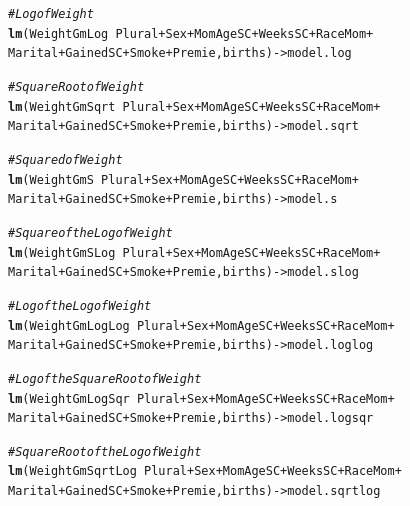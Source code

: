 \documentclass{article}\usepackage[]{graphicx}\usepackage[]{xcolor}
\makeatletter
\newcommand{\hlcom}[1]{\textcolor[rgb]{0.678,0.584,0.686}{\textit{#1}}}%
\newcommand{\hlopt}[1]{\textcolor[rgb]{0,0,0}{#1}}%
\newcommand{\hlstd}[1]{\textcolor[rgb]{0.345,0.345,0.345}{#1}}%
\newcommand{\hlkwb}[1]{\textcolor[rgb]{0.69,0.353,0.396}{#1}}%
\newcommand{\hlkwd}[1]{\textcolor[rgb]{0.737,0.353,0.396}{\textbf{#1}}}%
\newenvironment{kframe}{%
 \def\at@end@of@kframe{}%
 \ifinner\ifhmode%
  \def\at@end@of@kframe{\end{minipage}}%
  \begin{minipage}{\columnwidth}%
 \fi\fi%
 \def\FrameCommand##1{\hskip\@totalleftmargin \hskip-\fboxsep
 \colorbox{shadecolor}{##1}\hskip-\fboxsep
     \hskip-\linewidth \hskip-\@totalleftmargin \hskip\columnwidth}%
 \MakeFramed {\advance\hsize-\width
   \@totalleftmargin\z@ \linewidth\hsize
   \@setminipage}}%
 {\par\unskip\endMakeFramed%
 \at@end@of@kframe}
\newenvironment{knitrout}{}{} %
\makeatother
\begin{document}
\begin{knitrout}
\color{fgcolor}\begin{kframe}
\begin{alltt}
\hlcom{# Log of Weight}
\hlkwd{lm}\hlstd{(WeightGmLog} \hlopt{~} \hlstd{Plural} \hlopt{+} \hlstd{Sex} \hlopt{+} \hlstd{MomAgeSC} \hlopt{+} \hlstd{WeeksSC} \hlopt{+} \hlstd{RaceMom} \hlopt{+}
     \hlstd{Marital} \hlopt{+} \hlstd{GainedSC} \hlopt{+} \hlstd{Smoke} \hlopt{+} \hlstd{Premie, births)} \hlkwb{->} \hlstd{model.log}

\hlcom{# Square Root of Weight}
\hlkwd{lm}\hlstd{(WeightGmSqrt} \hlopt{~} \hlstd{Plural} \hlopt{+} \hlstd{Sex} \hlopt{+} \hlstd{MomAgeSC} \hlopt{+} \hlstd{WeeksSC} \hlopt{+} \hlstd{RaceMom} \hlopt{+}
     \hlstd{Marital} \hlopt{+} \hlstd{GainedSC} \hlopt{+} \hlstd{Smoke} \hlopt{+} \hlstd{Premie, births)} \hlkwb{->} \hlstd{model.sqrt}

\hlcom{# Squared of Weight}
\hlkwd{lm}\hlstd{(WeightGmS} \hlopt{~} \hlstd{Plural} \hlopt{+} \hlstd{Sex} \hlopt{+} \hlstd{MomAgeSC} \hlopt{+} \hlstd{WeeksSC} \hlopt{+} \hlstd{RaceMom} \hlopt{+}
     \hlstd{Marital} \hlopt{+} \hlstd{GainedSC} \hlopt{+} \hlstd{Smoke} \hlopt{+} \hlstd{Premie, births)} \hlkwb{->} \hlstd{model.s}

\hlcom{# Square of the Log of Weight}
\hlkwd{lm}\hlstd{(WeightGmSLog} \hlopt{~} \hlstd{Plural} \hlopt{+} \hlstd{Sex} \hlopt{+} \hlstd{MomAgeSC} \hlopt{+} \hlstd{WeeksSC} \hlopt{+} \hlstd{RaceMom} \hlopt{+}
     \hlstd{Marital} \hlopt{+} \hlstd{GainedSC} \hlopt{+} \hlstd{Smoke} \hlopt{+} \hlstd{Premie, births)} \hlkwb{->} \hlstd{model.slog}

\hlcom{# Log of the Log of Weight}
\hlkwd{lm}\hlstd{(WeightGmLogLog} \hlopt{~} \hlstd{Plural} \hlopt{+} \hlstd{Sex} \hlopt{+} \hlstd{MomAgeSC} \hlopt{+} \hlstd{WeeksSC} \hlopt{+} \hlstd{RaceMom} \hlopt{+}
     \hlstd{Marital} \hlopt{+} \hlstd{GainedSC} \hlopt{+} \hlstd{Smoke} \hlopt{+} \hlstd{Premie, births)} \hlkwb{->} \hlstd{model.loglog}

\hlcom{# Log of the Square Root of Weight}
\hlkwd{lm}\hlstd{(WeightGmLogSqr} \hlopt{~} \hlstd{Plural} \hlopt{+} \hlstd{Sex} \hlopt{+} \hlstd{MomAgeSC} \hlopt{+} \hlstd{WeeksSC} \hlopt{+} \hlstd{RaceMom} \hlopt{+}
     \hlstd{Marital} \hlopt{+} \hlstd{GainedSC} \hlopt{+} \hlstd{Smoke} \hlopt{+} \hlstd{Premie, births)} \hlkwb{->} \hlstd{model.logsqr}

\hlcom{# Square Root of the Log of Weight}
\hlkwd{lm}\hlstd{(WeightGmSqrtLog} \hlopt{~} \hlstd{Plural} \hlopt{+} \hlstd{Sex} \hlopt{+} \hlstd{MomAgeSC} \hlopt{+} \hlstd{WeeksSC} \hlopt{+} \hlstd{RaceMom} \hlopt{+}
     \hlstd{Marital} \hlopt{+} \hlstd{GainedSC} \hlopt{+} \hlstd{Smoke} \hlopt{+} \hlstd{Premie, births)} \hlkwb{->} \hlstd{model.sqrtlog}


\end{alltt}
\end{kframe}
\end{knitrout}
\end{document}
